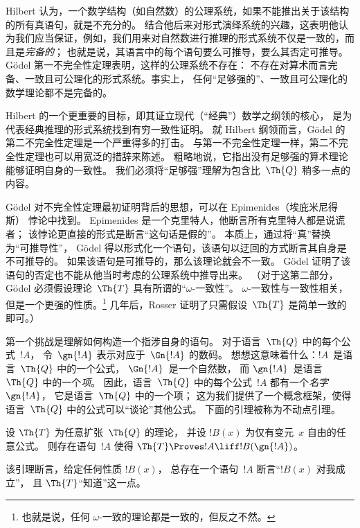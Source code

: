 \documentclass[../../../include/open-logic-section]{subfiles}
\begin{document}


Hilbert 认为，一个数学结构（如自然数）的公理系统，如果不能推出关于该结构的所有真语句，就是不充分的。
结合他后来对形式演绎系统的兴趣，这表明他认为我们应当保证，例如，我们用来对自然数进行推理的形式系统不仅是一致的，而且是\emph{完备的}；
也就是说，其语言中的每个语句要么可推导，要么其否定可推导。
Gödel 第一不完全性定理表明，这样的公理系统不存在：
不存在对算术而言完备、一致且可公理化的形式系统。事实上，
任何“足够强的”、一致且可公理化的数学理论都不是完备的。

Hilbert 的一个更重要的目标，即其证立现代（“经典”）数学之纲领的核心，
是为代表经典推理的形式系统找到有穷一致性证明。
就 Hilbert 纲领而言，Gödel 的第二不完全性定理是一个严重得多的打击。
与第一不完全性定理一样，第二不完全性定理也可以用宽泛的措辞来陈述。
粗略地说，它指出没有足够强的算术理论能够证明自身的一致性。
我们必须将“足够强”理解为包含比~$\Th{Q}$ 稍多一点的内容。

Gödel 对不完全性定理最初证明背后的思想，可以在 Epimenides（埃庇米尼得斯） 悖论中找到。
Epimenides 是一个克里特人，他断言所有克里特人都是说谎者；
该悖论更直接的形式是断言“这句话是假的”。
本质上，通过将“真”替换为“可推导性”，
Gödel 得以形式化一个语句，该语句以迂回的方式断言其自身是不可推导的。
如果该语句是可推导的，那么该理论就会不一致。
Gödel 证明了该语句的否定也不能从他当时考虑的公理系统中推导出来。
（对于这第二部分，Gödel 必须假设理论~$\Th{T}$ 具有所谓的“$\omega$-一致性”。
$\omega$-一致性与一致性相关，但是一个更强的性质。\footnote{也就是说，任何 $\omega$-一致的理论都是一致的，但反之不然。}
几年后，Rosser 证明了只需假设~$\Th{T}$ 是简单一致的即可。）

第一个挑战是理解如何构造一个指涉自身的语句。
对于语言~$\Th{Q}$ 中的每个公式~$!A$，
令~$\gn{!A}$ 表示对应于~$\Gn{!A}$ 的数码。
想想这意味着什么：$!A$~是语言~$\Th{Q}$ 中的一个公式，
$\Gn{!A}$~是一个自然数，
而 $\gn{!A}$~是语言~$\Th{Q}$ 中的一个\emph{项}。
因此，语言~$\Th{Q}$ 中的每个公式~$!A$ 都有一个\emph{名字}~$\gn{!A}$，
它是语言~$\Th{Q}$ 中的一个项；
这为我们提供了一个概念框架，使得语言~$\Th{Q}$ 中的公式可以“谈论”其他公式。
下面的引理被称为不动点引理。

\begin{lem}
设 $\Th{T}$ 为任意扩张~$\Th{Q}$ 的理论，
并设 $!B(x)$ 为仅有变元~$x$ 自由的任意公式。
则存在语句~$!A$ 使得 $\Th{T} \Proves!A \liff !B(\gn{!A})$。
\end{lem}

该引理断言，给定任何性质 $!B(x)$，
总存在一个语句~$!A$ 断言“$!B(x)$ 对我成立”，
且 $\Th{T}$“知道”这一点。
\end{document}
